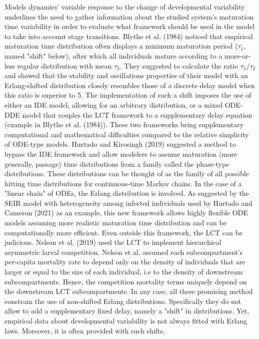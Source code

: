 \documentclass[12pt,a4paper,onecolumn]{article}
\begin{document}
\tabto{1 cm} Models dynamics' variable response to the change of developmental variability underlines the need to gather information about the studied system's maturation time variability in order to evaluate what framework should be used in the model to take into account stage transitions. Blythe et al. (1984) noticed that empirical maturation time distribution often displays a minimum maturation period ($\tau_1$, named "shift" below), after which all individuals mature according to a more-or-less regular distribution with mean $\tau_2$. They suggested to calculate the ratio $\tau_1/\tau_2$ and showed that the stability and oscillations properties of their model with an Erlang-shifted distribution closely resembles those of a discrete delay model when this ratio is superior to 5. The implementation of such a shift imposes the use of either an IDE model, allowing for an arbitrary distribution, or a mixed ODE-DDE model that couples the LCT framework to a supplementary delay equation (example in Blythe et al. (1984)). These two frameworks bring supplementary computational and mathematical difficulties compared to the relative simplicity of ODE-type models.
\tabto{1 cm} Hurtado and Kirosingh (2019) suggested a method to bypass the IDE framework and allow modelers to assume maturation (more generally, passage) time distributions from a family called the phase-type distributions. These distributions can be thought of as the family of all possible hitting time distributions for continuous-time Markov chains. In the case of a "linear chain" of ODEs, the Erlang distribution is involved. As suggested by the SEIR model with heterogeneity among infected individuals used by Hurtado and Cameron (2021) as an example, this new framework allows highly flexible ODE models assuming more realistic maturation time distribution and can be computationally more efficient. Even outside this framework, the LCT can be judicious. Nelson et al. (2019) used the LCT to implement hierarchical asymmetric larval competition. Nelson et al. assumed each subcompartment's per-capita mortality rate to depend only on the density of individuals that are larger or equal to the size of each individual, i.e to the density of downstream subcompartments. Hence, the competition mortality terms uniquely depend on the downstream LCT subcompartments. In any case, all these promising method constrain the use of non-shifted Erlang distributions. Specifically they do not allow to add a supplementary fixed delay, namely a "shift" in distributions. Yet, empirical data about developmental variability is not always fitted with Erlang laws. Moreover, it is often provided with such shifts. 
\end{document}
